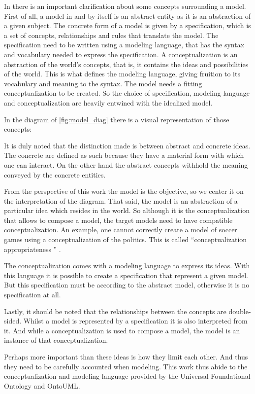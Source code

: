 In \cite{guizzardi_ontological_2005} there is an important clarification about some concepts surrounding a model. First of all, a model in and by itself is an abstract entity as it is an abstraction of a given subject. The concrete form of a model is given by a specification, which is a set of concepts, relationships and rules that translate the model. The specification need to be written using a modeling language, that has the syntax and vocabulary needed to express the specification. A conceptualization is an abstraction of the world's concepts, that is, it contains the ideas and possibilities of the world. This is what defines the modeling language, giving fruition to its vocabulary and meaning to the syntax. The model needs a fitting conceptualization to be created. So the choice of specification, modeling language and conceptualization are heavily entwined with the idealized model.

In the diagram of \autoref{fig:model_diag} there is a visual representation of those concepts:



It is duly noted that the distinction made is between abstract and concrete ideas. The concrete are defined as such because they have a material form with which one can interact. On the other hand the abstract concepts withhold the meaning conveyed by the concrete entities.

From the perspective of this work the model is the objective, so we center it on the interpretation of the diagram. That said, the model is an abstraction of a particular idea which resides in the world. So although it is the conceptualization that allows to compose a model, the target models need to have compatible conceptualization. An example, one cannot correctly create a model of soccer games using a conceptualization of the politics. This is called ``conceptualization appropriateness '' \cite{guizzardi_ontological_2005}.

The conceptualization comes with a modeling language to express its ideas. With this language it is possible to create a specification that represent a given model. But this specification must be according to the abstract model, otherwise it is no specification at all. 

Lastly, it should be noted that the relationships between the concepts are double-sided. Whilst a model is represented by a specification it is also interpreted from it. And while a conceptualization is used to compose a model, the model is an instance of that conceptualization.

Perhaps more important than these ideas is how they limit each other. And thus they need to be carefully accounted when modeling. This work thus abide to the conceptualization and modeling language provided by the Universal Foundational Ontology and OntoUML.